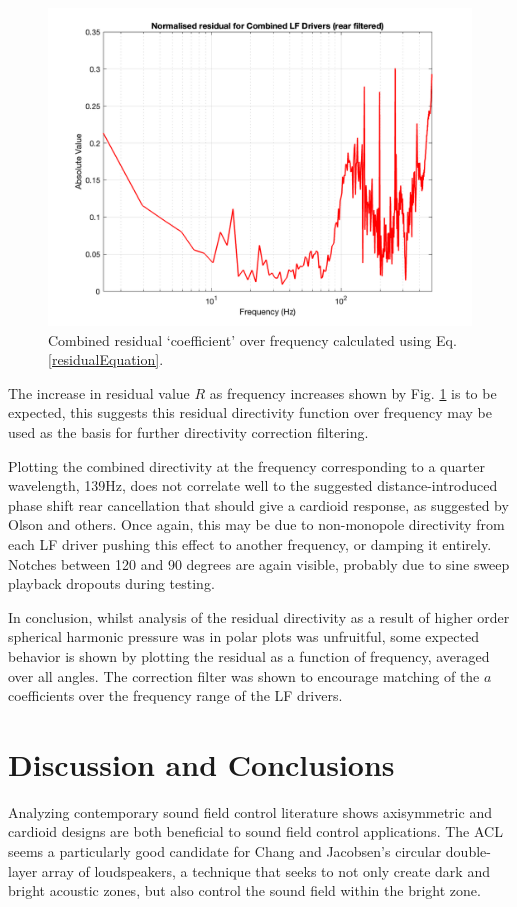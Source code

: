 \documentclass{report}
\begin{document}
    \begin{figure}[H]
        \centering
        \includegraphics[width=0.8\linewidth]{figs/residualOverf.png}
        \caption{Combined residual `coefficient' over frequency calculated using Eq. \ref{residualEquation}.}
        \label{residualOverf}
    \end{figure}

    The increase in residual value $R$ as frequency increases shown by Fig. \ref{residualOverf} is to be expected, this suggests this residual directivity function over frequency may be used as the basis for further directivity correction filtering.

    Plotting the combined directivity at the frequency corresponding to a quarter wavelength, 139Hz, does not correlate well to the suggested distance-introduced phase shift rear cancellation that should give a cardioid response, as suggested by Olson and others.
    Once again, this may be due to non-monopole directivity from each LF driver pushing this effect to another frequency, or damping it entirely.
    Notches between 120 and 90 degrees are again visible, probably due to sine sweep playback dropouts during testing.

    In conclusion, whilst analysis of the residual directivity as a result of higher order spherical harmonic pressure was in polar plots was unfruitful, some expected behavior is shown by plotting the residual as a function of frequency, averaged over all angles.
    The correction filter was shown to encourage matching of the $a$ coefficients over the frequency range of the LF drivers. 

\chapter{Discussion and Conclusions}
    Analyzing contemporary sound field control literature shows axisymmetric and cardioid designs are both beneficial to sound field control applications.
    The ACL seems a particularly good candidate for Chang and Jacobsen's circular double-layer array of loudspeakers, a technique that seeks to not only create dark and bright acoustic zones, but also control the sound field within the bright zone.
\end{document}
